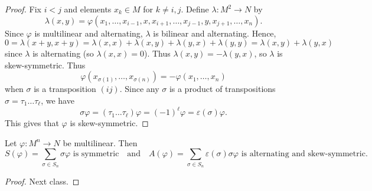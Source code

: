 \begin{proof}
  Fix $i < j$ and elements $x_k \in M$ for $k \ne i, j$.
  Define $\lambda : M^2 \to N$ by
  \[
    \lambda(x, y) = \varphi(x_1, \dots, x_{i-1}, x, x_{i+1}, \dots, x_{j-1}, y, x_{j+1}, \dots, x_n).
  \]
  Since $\varphi$ is multilinear and alternating,
  $\lambda$ is bilinear and alternating. Hence,
  \[
    0 = \lambda(x + y, x + y)
    = \lambda(x, x) + \lambda(x, y) + \lambda(y, x) + \lambda(y, y)
    = \lambda(x, y) + \lambda(y, x)
  \]
  since $\lambda$ is alternating (so $\lambda(x, x) = 0$).
  Thus $\lambda(x, y) = -\lambda(y, x)$, so
  $\lambda$ is skew-symmetric. Thus
  \[
    \varphi(x_{\sigma(1)}, \dots, x_{\sigma(n)})
    = - \varphi(x_1, \dots, x_n)
  \]
  when $\sigma$ is a transposition $(ij)$. Since
  any $\sigma$ is a product of transpositions
  $\sigma = \tau_1 \dots \tau_\ell$, we have
  \[
    \sigma \varphi = (\tau_1 \dots \tau_\ell) \varphi
    = (-1)^\ell \varphi = \varepsilon(\sigma) \varphi.
  \]
  This gives that $\varphi$ is skew-symmetric.
\end{proof}

\begin{lemma}
  Let $\varphi : M^n \to N$ be multilinear. Then
  \[
    S(\varphi) = \sum_{\sigma \in S_n} \sigma \varphi
    \text{ is symmetric} \quad \text{and} \quad
    A(\varphi) = \sum_{\sigma \in S_n} \varepsilon(\sigma) \sigma \varphi
    \text{ is alternating and skew-symmetric}.
  \]
\end{lemma}

\begin{proof}
  Next class.
\end{proof}
